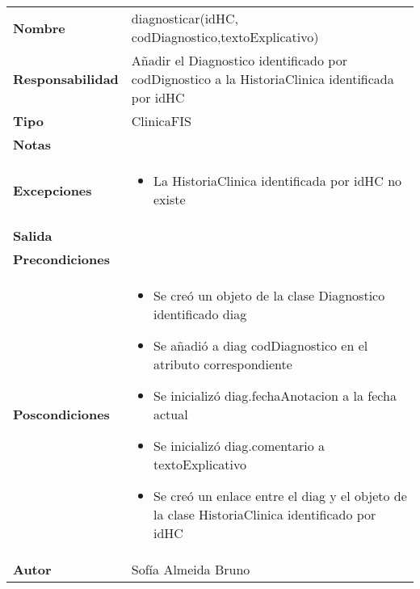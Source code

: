 \documentclass[11pt,a4paper]{article}
\newenvironment{itemizenomargins}
    {\begin{minipage}[t]{1\linewidth}\begin{itemize}}
    {\end{itemize}\end{minipage}}
\begin{document}
\begin{table}[H]
\centering
\label{my-label}
\begin{tabularx}{\textwidth}{l|X}
\textbf{Nombre}          & diagnosticar(idHC, codDiagnostico,textoExplicativo) \\
\textbf{Responsabilidad} & Añadir el Diagnostico identificado por codDignostico a la HistoriaClinica identificada por idHC\\
\textbf{Tipo}            & ClinicaFIS \\
\textbf{Notas}           &  \\
\textbf{Excepciones}     & 
\begin{itemizenomargins}
\item La HistoriaClinica identificada por idHC no existe
\end{itemizenomargins}\\
\textbf{Salida}          &  \\
\textbf{Precondiciones}  &  \\
\textbf{Poscondiciones}  &
\begin{itemizenomargins}
\item Se creó un objeto de la clase Diagnostico identificado diag
\item Se añadió a diag codDiagnostico en el atributo correspondiente
\item Se inicializó diag.fechaAnotacion a la fecha actual
\item Se inicializó diag.comentario a textoExplicativo
\item Se creó un enlace entre el diag y el objeto de la clase HistoriaClinica identificado por idHC
\end{itemizenomargins}\\
\textbf{Autor}           & Sofía Almeida Bruno
\end{tabularx}
\end{table}
\end{document}
